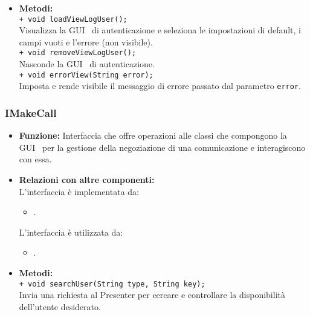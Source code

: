 {\begin{sloppypar}
{{\begin{itemize}
			\item[] \textbf{Metodi:}\\
				\texttt{+ void loadViewLogUser();}\\
				Visualizza la GUI\g~ di autenticazione e seleziona le impostazioni di default\g, i campi vuoti e l'errore (non visibile).\\

				\texttt{+ void removeViewLogUser();}\\
				Nasconde la GUI\g~ di autenticazione.\\

				\texttt{+ void errorView(String error);}\\
				Imposta e rende visibile il messaggio di errore passato dal parametro \texttt{error}.\\
		\end{itemize}
		}
		
		
		\subsubsection{IMakeCall}\label{ssub:IMakeCall}{
		\begin{itemize}
			\item[]  \textbf{Funzione:}
				Interfaccia che offre operazioni alle classi che compongono la 
				GUI\g~ per la gestione della negoziazione di una comunicazione e interagiscono con essa.\\
		
			\item[]  \textbf{Relazioni con altre componenti:} \\
				L'interfaccia è implementata da:
				\begin{itemize}
					\item[] .
				\end{itemize}
				L'interfaccia è utilizzata da:
				\begin{itemize}
					\item[] .\\
				\end{itemize}
					
			\item[]  \textbf{Metodi:}\\
				\texttt{+ void searchUser(String type, String key);}\\
				Invia una richiesta al Presenter per cercare e controllare la disponibilità dell'utente 
				desiderato.\\
		\end{itemize}		
		}
		
}
\end{sloppypar}}
